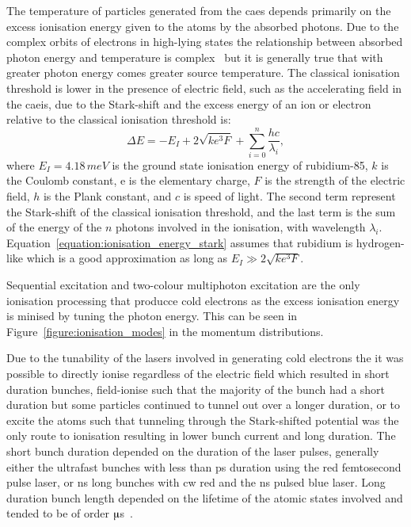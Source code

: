 The temperature of particles generated from the \gls{caes} depends primarily on the excess ionisation energy given to the atoms by the absorbed photons.
Due to the complex orbits of electrons in high-lying states the relationship between absorbed photon energy and temperature is complex~\cite{mcculloch_high-coherence_2013} but it is generally true that with greater photon energy comes greater source temperature.
The classical ionisation threshold is lower in the presence of electric field, such as the accelerating field in the \gls{caeis}, due to the Stark-shift and the excess energy of an ion or electron relative to the classical ionisation threshold is:
\begin{equation}\label{equation:ionisation_energy_stark}
\Delta E = -E_I + 2\sqrt{ke^3F} + \sum_{i=0}^{n}{\frac{hc}{\lambda_i}},
\end{equation}
where $E_I=4.18\,meV$ is the ground state ionisation energy of rubidium-85, $k$ is the Coulomb constant, e is the elementary charge, $F$ is the strength of the electric field, $h$ is the Plank constant, and $c$ is speed of light.
The second term represent the Stark-shift of the classical ionisation threshold, and the last term is the sum of the energy of the $n$ photons involved in the ionisation, with wavelength $\lambda_i$.
Equation~\ref{equation:ionisation_energy_stark} assumes that rubidium is hydrogen-like which is a good approximation as long as $E_I \gg 2\sqrt{ke^3F}$.

Sequential excitation and two-colour multiphoton excitation are the only ionisation processing that producce cold electrons as the excess ionisation energy is minised by tuning the photon energy.
This can be seen in Figure~\ref{figure:ionisation_modes} in the momentum distributions.

Due to the tunability of the lasers involved in generating cold electrons the it was possible to directly ionise regardless of the electric field which resulted in short duration bunches, field-ionise such that the majority of the bunch had a short duration but some particles continued to tunnel out over a longer duration, or to excite the atoms such that tunneling through the Stark-shifted potential was the only route to ionisation resulting in lower bunch current and long duration.
The short bunch duration depended on the duration of the laser pulses, generally either the ultrafast bunches with less than \unit[320]{ps} duration using the red femtosecond pulse laser, or \unit[5]{ns} long bunches with \gls{cw} red and the \unit[5]{ns} pulsed blue laser.
Long duration bunch length depended on the lifetime of the atomic states involved and tended to be of order \unit[10]{$\muup$s}~\cite{speirs_identification_2017}.


